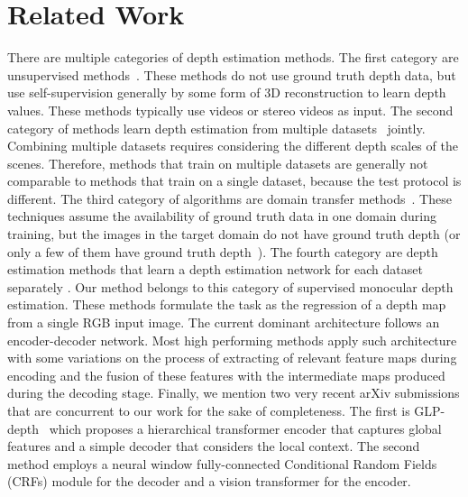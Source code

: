 \documentclass[runningheads]{llncs}
\begin{document}
\section{Related Work}
There are multiple categories of depth estimation methods. The first category are unsupervised methods~\cite{Xie2016Deep3DFA,Zhou2017,Godard2017,Godard2018DiggingIS,casser2019unsupervised,Gordon_2019_ICCV,li2020unsupervised,Zhou2021Diffnet,Watson_2021_CVPR}. These methods do not use ground truth depth data, but use self-supervision generally by some form of 3D reconstruction to learn depth values. These methods typically use videos or stereo videos as input.
The second category of methods learn depth estimation from multiple datasets~\cite{MDLi18,Ranftl2020MiDaS,Ranftl_2021_ICCV} jointly. Combining multiple datasets requires considering the different depth scales of the scenes. Therefore, methods that train on multiple datasets are generally not comparable to methods that train on a single dataset, because the test protocol is different. The third category of algorithms are domain transfer methods~\cite{atapour2018real,zhao2019geometry,Tonioni2019,CrDoCo2019,AkadaBAW22}. These techniques assume the availability of ground truth data in one domain during training, but the images in the target domain do not have ground truth depth (or only a few of them have ground truth depth~\cite{Zhao_2020_CVPR}). 
The fourth category are depth estimation methods that learn a depth estimation network for each dataset separately \cite{Eigen2014,Laina2016,Xu2017,Hao2018DetailPD,Xu2018StructuredAG,Fu2018DeepOR,Hu2018RevisitingSI,Alhashim2018,bts_lee2019big,dav_huynh2020guiding,Bhat2021}. Our method belongs to this category of supervised monocular depth estimation. These methods formulate the task as the regression of a depth map from a single RGB input image. The current dominant architecture follows an encoder-decoder network. Most high performing methods apply such architecture with some variations on the process of extracting of relevant feature maps during encoding and the fusion of these features with the intermediate maps produced during the decoding stage. 
Finally, we mention two very recent arXiv submissions that are concurrent to our work for the sake of completeness. The first is GLP-depth~\cite{kim2022global} which proposes a hierarchical transformer encoder that captures global features and a simple decoder that considers the local context. The second method \cite{Yuan2022_cvpr_crf} employs a neural window fully-connected Conditional Random Fields (CRFs) module for the decoder and a vision transformer for the encoder.
\end{document}
